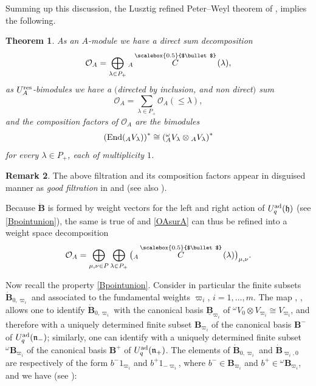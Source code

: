 \documentclass[pdftex]{sigma}
\numberwithin{equation}{section}
\newtheorem{teo}{Theorem}[section]
\theoremstyle{definition}
\newtheorem{Remark}[teo]{Remark}
\newcommand{\Oo}{{\mathcal O}}
\newcommand{\smallbullet}{%
\vcenter{\hbox{\,\scalebox{0.5}{$\bullet$}\,}}
}
\begin{document}
Summing up this discussion, the Lusztig refined Peter--Weyl theorem of \cite[Section~29.3]{Lusztig}, implies the following.

\begin{teo} As an $A$-module we have a direct sum decomposition
\begin{equation}\label{OAsurA} \Oo_A = \bigoplus_{\lambda\in P_+} {}_A \overset{\raisebox{-1.5pt}{\scriptsize$\smallbullet$}}{C} (\lambda),
\end{equation}
as $U_A^{\rm res}$-bimodules we have a $($directed by inclusion, and non direct$)$ sum
\begin{equation}\label{OAbimod}
\Oo_A = \sum_{\lambda\in P_+} \Oo_A(\leq \lambda),
\end{equation}
and the composition factors of $\Oo_A$ are the bimodules
\begin{equation}\label{OAfacteurs}
\left({\rm End}({}_A V_\lambda)\right)^* \cong \left({}_A^{\omega} V_\lambda \otimes {}_A V_\lambda \right)^*
\end{equation}
for every $\lambda\in P_+$, each of multiplicity $1$. \end{teo}
\begin{Remark}{\rm The above filtration and its composition factors appear in disguised manner as {\it good filtration} in \cite{APW} and \cite{Paradowski} (see also \cite{VV}).}
\end{Remark}
Because $\dot{\mathbf{B}}$ is formed by weight vectors for the left and right action of $U_q^{\rm ad}(\mathfrak{h})$ (see \eqref{Bpointunion}), the same is true of  and \eqref{OAsurA} can thus be refined into a weight space decomposition
\begin{equation}\label{OAweightdecomp} \Oo_A = \bigoplus_{\mu,\nu\in P}\bigoplus_{\lambda\in P_+} \big({}_A \overset{\raisebox{-1.5pt}{\scriptsize$\smallbullet$}}{C} (\lambda)\big)_{\mu,\nu}.
\end{equation}

Now recall the property \eqref{Bpointunion}. Consider in particular the finite subsets $\dot{\mathbf{B}}_{0,\varpi_i}$ and  associated to the fundamental weights $\varpi_i$, $i=1,\dots, m$. The map , , allows one to identify $\dot{\mathbf{B}}_{0,\varpi_i}$ with the canonical basis $\underline{\mathbf{B}}_{\varpi_i}$ of ${}^\omega V_{0}\otimes V_{\varpi_i} \cong V_{\varpi_i}$, and therefore with a uniquely determined finite subset $\mathbf{B}_{\varpi_i}$ of the canonical basis $\mathbf{B}^-$ of $U_q^{\rm ad}(\mathfrak{n}_-)$; similarly, one can identify  with a uniquely determined finite subset ${}^\omega \mathbf{B}_{\varpi_i}$ of the canonical basis $\mathbf{B}^+$ of $U_q^{\rm ad}(\mathfrak{n}_+)$. The elements of $\dot{\mathbf{B}}_{0,\varpi_i}$ and $\dot{\mathbf{B}}_{\varpi_i,0}$ are respectively of the form $b^-1_{\varpi_i}$ and $b^+1_{-\varpi_i}$, where $b^- \in \mathbf{B}_{\varpi_i}$ and $b^+\in {}^\omega \mathbf{B}_{\varpi_i}$, and we have (see \cite[Proposition~3.3 and Section~3.4]{Lusztig3}):
\end{document}
